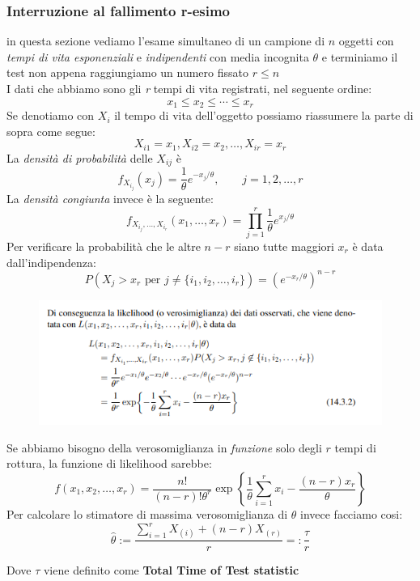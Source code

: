 \documentclass[]{article}
\begin{document}
    \subsubsection{Interruzione al fallimento r-esimo}
    in questa sezione vediamo l'esame simultaneo di un campione di $n$ oggetti con \textit{tempi di vita esponenziali} e \textit{indipendenti} con media incognita $\theta$ e terminiamo il test non appena raggiungiamo un numero fissato $r \leq n$ \\
    I dati che abbiamo sono gli \textit{r} tempi di vita registrati, nel seguente ordine:
    \[ x_1 \leq x_2 \leq \cdots \leq x_r \]
    Se denotiamo con $X_i$ il tempo di vita dell'oggetto possiamo riassumere la parte di sopra come segue:
    \[ X_{i1} = x_1, X_{i2} = x_2, \ldots, X_{ir} = x_r \]
    La \textit{densità di probabilità} delle $X_{ij}$ è
    \[ f_{X_{i_j}} (x_j) = \frac{1}{\theta} e^{-x_j / \theta}, \qquad j = 1,2,\ldots, r \]
    La \textit{densità congiunta} invece è la seguente:
    \[ f_{X_{i_j}, \ldots, X_{i_r}} (x_1, \ldots, x_r) = \prod_{j=1}^{r} \frac{1}{\theta} e^{x_j / \theta} \]
    Per verificare la probabilità che le altre $n-r$ siano tutte maggiori $x_r$ è data dall'indipendenza:
    \[ P(X_j > x_r \text{ per } j \not = \{ i_1, i_2, \ldots, i_r \}) = (e^{-x_r / \theta})^{n-r} \]
    \begin{figure}[H]
        \includegraphics[width=\textwidth]{images/boh_12.png}
    \end{figure}
    Se abbiamo bisogno della verosomiglianza in \textit{funzione} solo degli $r$ tempi di rottura, la funzione di likelihood sarebbe:
    \[ f(x_1, x_2, \ldots, x_r) = \frac{n!}{(n-r)! \theta^r} \exp \left\{ \frac{1}{\theta} \sum_{i=1}^{r} x_i - \frac{(n-r) x_r}{\theta} \right\} \]
    Per calcolare lo stimatore di massima verosomiglianza di $\theta$ invece facciamo cosi:
    \[ \hat{\theta} := \frac{\sum_{i=1}^{r} X_{(i)} + (n-r) X_{(r)}}{r} =: \frac{\tau}{r} \]
    \centerline{Dove $\tau$ viene definito come \textbf{Total Time of Test statistic}} \\[2ex]
\end{document}
